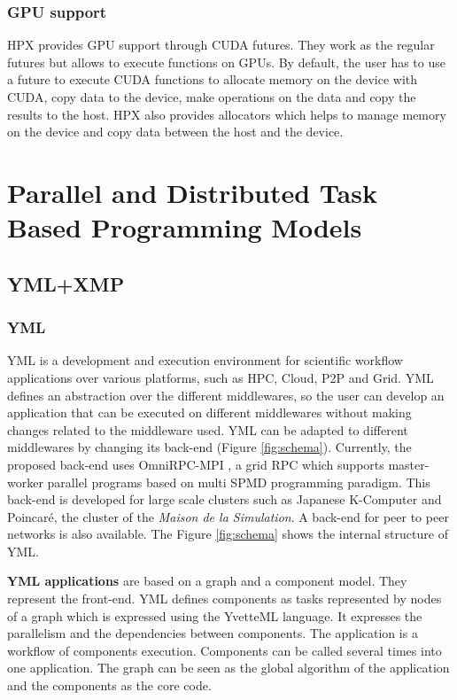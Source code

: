 \subsubsection{GPU support}
HPX provides GPU support through CUDA futures.
They work as the regular futures but allows to execute functions on GPUs.
By default, the user has to use a future to execute CUDA functions to allocate memory on the device with CUDA, copy data to the device, make operations on the data and copy the results to the host.
HPX also provides allocators which helps to manage memory on the device and copy data between the host and the device.

\section{Parallel and Distributed Task Based Programming Models}
\subsection{YML+XMP}

\subsubsection{YML}
YML \cite{DelaP2004} \cite{DelEP2006} is a development and execution environment for scientific workflow applications over various platforms, such as HPC, Cloud, P2P and Grid.
YML defines an abstraction over the different middlewares, so the user can develop an application that can be executed on different middlewares without making changes related to the middleware used.
YML can be adapted to different middlewares by changing its back-end (Figure \ref{fig:schema}).
Currently, the proposed back-end \cite{TsSHP2013} \cite{TsuPS2015} uses OmniRPC-MPI \cite{SaHTS2001} \cite{SatBT2003}, a grid RPC which supports master-worker parallel programs based on multi SPMD programming paradigm.
This back-end is developed for large scale clusters such as Japanese K-Computer and Poincar\'e, the cluster of the \textit{Maison de la Simulation}.
A back-end for peer to peer networks is also available.
The Figure \ref{fig:schema} shows the internal structure of YML.

\textbf{YML applications} are based on a graph and a component model.
They represent the front-end.
YML defines components as tasks represented by nodes of a graph which is expressed using the YvetteML language.
It expresses the parallelism and the dependencies between components.
The application is a workflow of components execution.
Components can be called several times into one application.
The graph can be seen as the global algorithm of the application and the components as the core code.


